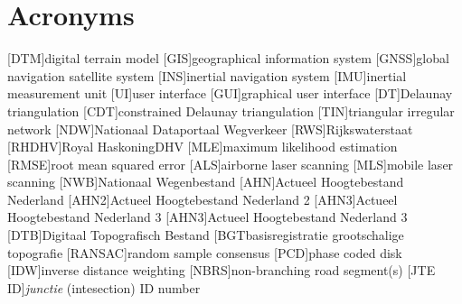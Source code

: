 \chapter*{Acronyms}

\begin{acronym}[UML]
  [DTM]{digital terrain model}
  [GIS]{geographical information system}
  [GNSS]{global navigation satellite system}
  [INS]{inertial navigation system}
  [IMU]{inertial measurement unit}
  [UI]{user interface}
  [GUI]{graphical user interface}
  [DT]{Delaunay triangulation}
  [CDT]{constrained Delaunay triangulation}
  [TIN]{triangular irregular network}
  [NDW]{Nationaal Dataportaal Wegverkeer}
  [RWS]{Rijkswaterstaat}
  [RHDHV]{Royal HaskoningDHV}
  [MLE]{maximum likelihood estimation}
  [RMSE]{root mean squared error}
  [ALS]{airborne laser scanning}
  [MLS]{mobile laser scanning}
  [NWB]{Nationaal Wegenbestand}
  [AHN]{Actueel Hoogtebestand Nederland}
  [AHN2]{Actueel Hoogtebestand Nederland 2}
  [AHN3]{Actueel Hoogtebestand Nederland 3}
  [AHN3]{Actueel Hoogtebestand Nederland 3}
  [DTB]{Digitaal Topografisch Bestand}
  [BGT{basisregistratie grootschalige topografie}
  [RANSAC]{random sample consensus}
  [PCD]{phase coded disk}
  [IDW]{inverse distance weighting}
  [NBRS]{non-branching road segment(s)}
  [JTE ID]{\textit{junctie} (intesection) ID number}
\end{acronym}